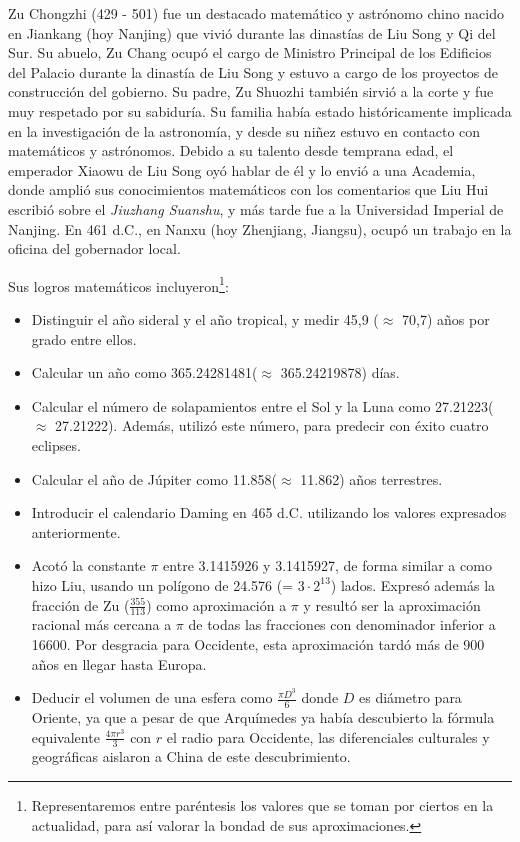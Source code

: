 \documentclass[a4paper, 11pt]{article}
\begin{document}
		Zu Chongzhi (429 - 501) fue un destacado matemático y astrónomo chino nacido en Jiankang (hoy Nanjing) que
		vivió durante las dinastías de Liu Song y Qi del Sur. Su abuelo, Zu Chang ocupó el cargo de Ministro Principal
		de los Edificios del Palacio durante la dinastía de Liu Song y estuvo a cargo de los proyectos de construcción
		del gobierno. Su padre, Zu Shuozhi también sirvió a la corte y fue muy respetado por su sabiduría. Su familia
		había estado históricamente implicada en la investigación de la astronomía, y desde su niñez estuvo en contacto
		con matemáticos y astrónomos. Debido a su talento desde temprana edad, el emperador Xiaowu de Liu Song oyó hablar
		de él y lo envió a una Academia, donde amplió sus conocimientos matemáticos con los comentarios que Liu Hui
		escribió sobre el \textit{Jiuzhang Suanshu}, y más tarde fue a la Universidad Imperial de Nanjing. En 461 d.C.,
		en Nanxu (hoy Zhenjiang, Jiangsu), ocupó un trabajo en la oficina del gobernador local.
		
		Sus logros matemáticos incluyeron\footnote{Representaremos entre paréntesis los valores que se toman por ciertos
		en la actualidad, para así valorar la bondad de sus aproximaciones.}:
		\begin{itemize}
			\item Distinguir el año sideral y el año tropical, y medir 45,9 ($\approx$ 70,7) años por grado entre ellos.
			\item Calcular un año como 365.24281481($\approx$ 365.24219878) días.
			\item Calcular el número de solapamientos entre el Sol y la Luna como 27.21223($\approx$ 27.21222). Además,
			utilizó este número, para predecir con éxito cuatro eclipses.
			\item Calcular el año de Júpiter como 11.858($\approx$ 11.862) años terrestres.
			\item Introducir el calendario Daming en 465 d.C. utilizando los valores expresados anteriormente.
			\item Acotó la constante $\pi$ entre 3.1415926 y 3.1415927, de forma similar a como hizo Liu, usando un
			polígono de 24.576 (= $3 \cdot 2^13$) lados. Expresó además la fracción de Zu ($\frac{355}{113}$) como
			aproximación a $\pi$ y resultó ser la aproximación racional más cercana a $\pi$ de todas las fracciones con
			denominador inferior a 16600. Por desgracia para Occidente, esta aproximación tardó más de 900 años en llegar
			hasta Europa.
			\item Deducir el volumen de una esfera como $\frac{\pi D^3}{6}$ donde $D$ es diámetro para Oriente, ya que
			a pesar de que Arquímedes ya había descubierto la fórmula equivalente $\frac{4 \pi r^3}{3}$ con $r$ el radio
			para Occidente, las diferenciales culturales y geográficas aislaron a China de este descubrimiento.
		\end{itemize}
		
\end{document}
